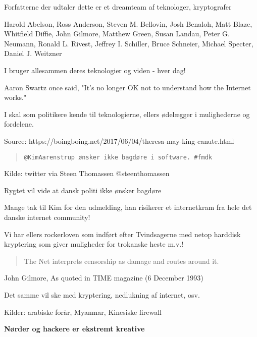 \documentclass[20pt,landscape,a4paper,footrule]{foils}
\begin{document}
Forfatterne der udtaler dette er et dreamteam af teknologer, kryptografer

Harold Abelson, Ross Anderson, Steven M. Bellovin, Josh Benaloh, Matt Blaze,
Whitfield Diffie, John Gilmore, Matthew Green, Susan Landau, Peter G. Neumann,
Ronald L. Rivest, Jeffrey I. Schiller, Bruce Schneier, Michael Specter, Daniel J. Weitzner

I bruger allesammen deres teknologier og viden - hver dag!




Aaron Swartz once said, "It's no longer OK not to understand how the Internet works."

I skal som politikere kende til teknologierne, ellers ødelægger i mulighederne og fordelene.

Source:
https://boingboing.net/2017/06/04/theresa-may-king-canute.html



\begin{quote}
\verb+@KimAarenstrup ønsker ikke bagdøre i software. #fmdk+
\end{quote}
Kilde: twitter via Steen Thomassen @steenthomassen\\

Rygtet vil vide at dansk politi ikke ønsker bagdøre

Mange tak til Kim for den udmelding, han risikerer et internetkram
fra hele det danske internet community!

Vi har ellers rockerloven som indført efter Tvindsagerne med netop
harddisk kryptering som giver muligheder for trokanske heste m.v.!



\begin{quote}
  The Net interprets censorship as damage and routes around it.
\end{quote}
John Gilmore, As quoted in TIME magazine (6 December 1993)

Det samme vil ske med kryptering, nedlukning af internet, osv.

Kilder: arabiske forår, Myanmar, Kinesiske firewall

\vskip 1cm
\centerline{\bf Nørder og hackere er ekstremt kreative}



\end{document}
